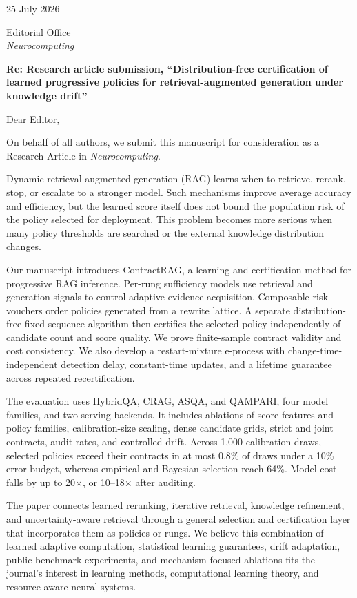 \documentclass[11pt]{article}
\begin{document}
\raggedright
{}

25 July 2026

Editorial Office\\
\textit{Neurocomputing}

\textbf{Re: Research article submission, ``Distribution-free
certification of learned progressive policies for retrieval-augmented
generation under knowledge drift''}

Dear Editor,

On behalf of all authors, we submit this manuscript for consideration
as a Research Article in \textit{Neurocomputing}.

Dynamic retrieval-augmented generation (RAG) learns when to retrieve,
rerank, stop, or escalate to a stronger model. Such mechanisms improve
average accuracy and efficiency, but the learned score itself does not
bound the population risk of the policy selected for deployment. This
problem becomes more serious when many policy thresholds are searched
or the external knowledge distribution changes.

Our manuscript introduces ContractRAG, a learning-and-certification
method for progressive RAG inference. Per-rung sufficiency models use
retrieval and generation signals to control adaptive evidence
acquisition. Composable risk vouchers order policies generated from a
rewrite lattice. A separate distribution-free fixed-sequence algorithm
then certifies the selected policy independently of candidate count and
score quality. We prove finite-sample contract validity and cost
consistency. We also develop a restart-mixture e-process with
change-time-independent detection delay, constant-time updates, and a
lifetime guarantee across repeated recertification.

The evaluation uses HybridQA, CRAG, ASQA, and QAMPARI, four model
families, and two serving backends. It includes ablations of score
features and policy families, calibration-size scaling, dense candidate
grids, strict and joint contracts, audit rates, and controlled drift.
Across 1,000 calibration draws, selected policies exceed their
contracts in at most 0.8\% of draws under a 10\% error budget, whereas
empirical and Bayesian selection reach 64\%. Model cost falls by up to
20$\times$, or 10--18$\times$ after auditing.

The paper connects learned reranking, iterative retrieval, knowledge
refinement, and uncertainty-aware retrieval through a general
selection and certification layer that incorporates them as policies
or rungs. We believe this combination of learned adaptive computation, statistical
learning guarantees, drift adaptation, public-benchmark experiments,
and mechanism-focused ablations fits the journal's interest in learning
methods, computational learning theory, and resource-aware neural
systems.
\end{document}
